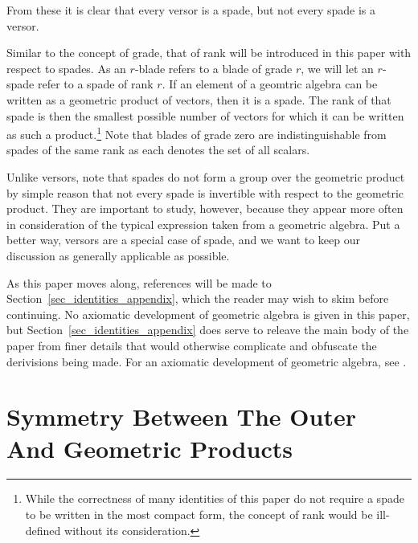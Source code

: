 \documentclass{birkjour}
\theoremstyle{definition}
\theoremstyle{remark}
\numberwithin{equation}{section}
\begin{document}
From these it is clear that every versor is a spade, but not every spade is a versor.

Similar to the concept of grade, that of rank will be introduced in this paper with respect to spades.  As an $r$-blade
refers to a blade of grade $r$, we will let an $r$-spade refer to a spade of rank $r$.  If an element of a geomtric
algebra can be written as a geometric product of vectors, then it is a spade.  The rank of that spade is then the smallest
possible number of vectors for which it can be written as such a product.\footnote{While the correctness of many identities of this paper
do not require a spade to be written in the most compact form, the concept of rank would be ill-defined without its consideration.}   Note that blades of grade zero
are indistinguishable from spades of the same rank as each denotes the set of all scalars.

Unlike versors, note that spades do not form a group over the geometric product by simple reason that not every
spade is invertible with respect to the geometric product.  They are important to study, however,
because they appear more often in consideration of the typical expression taken from a geometric algebra.
Put a better way, versors are a special case of spade, and we want to keep our discussion as generally applicable as possible.

As this paper moves along, references will be made to Section~\ref{sec_identities_appendix}, which the reader may wish to skim before continuing.
No axiomatic development of geometric algebra is given in this paper, but Section~\ref{sec_identities_appendix} does serve to releave the main
body of the paper from finer details that would otherwise complicate and obfuscate the derivisions being made.  For an axiomatic
development of geometric algebra, see \cite{}.

\section{Symmetry Between The Outer And Geometric Products}
\end{document}

